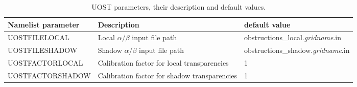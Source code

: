 \begin{table} \begin{center}
 \footnotesize
\begin{tabular}{|p{4cm}|p{2.5cm}|p{5.5cm}|} \hline \hline
Namelist parameter    &  Description           & default value \\
\hline
  UOSTFILELOCAL &  Local $\alpha$/$\beta$ input file path   &  obstructions\_local.\textit{gridname}.in    \\ \hline
  UOSTFILESHADOW &  Shadow $\alpha$/$\beta$ input file path   & obstructions\_shadow.\textit{gridname}.in   \\ \hline
  UOSTFACTORLOCAL &  Calibration factor for local transparencies  &  1   \\ \hline
  UOSTFACTORSHADOW &  Calibration factor for shadow transparencies  &  1  \\
\hline
\end{tabular} \end{center}
\caption{UOST parameters, their description and default values. } \label{tab:UOST}
\botline
\end{table}

